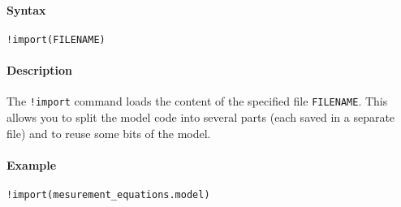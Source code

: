 


	\paragraph{Syntax}\label{syntax}

\begin{verbatim}
!import(FILENAME)
\end{verbatim}

\paragraph{Description}\label{description}

The \texttt{!import} command loads the content of the specified file
\texttt{FILENAME}. This allows you to split the model code into several
parts (each saved in a separate file) and to reuse some bits of the
model.

\paragraph{Example}\label{example}

\begin{verbatim}
!import(mesurement_equations.model)
\end{verbatim}


